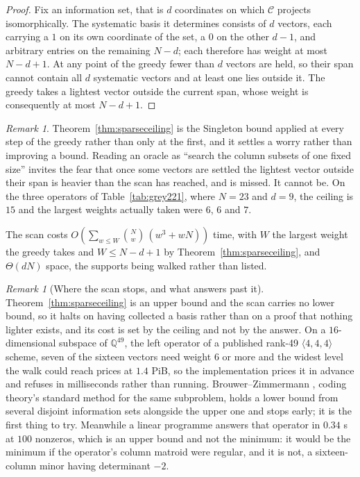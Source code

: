 \documentclass[11pt,reqno]{amsart}
\theoremstyle{plain}
\theoremstyle{definition}
\theoremstyle{remark}
\newtheorem{remark}[theorem]{Remark}
\begin{document}
\begin{proof}
Fix an information set, that is $d$ coordinates on which $\mathcal{C}$ projects
isomorphically. The systematic basis it determines consists of $d$ vectors, each
carrying a $1$ on its own coordinate of the set, a $0$ on the other $d-1$, and
arbitrary entries on the remaining $N-d$; each therefore has weight at most
$N-d+1$. At any point of the greedy fewer than $d$ vectors are held, so their
span cannot contain all $d$ systematic vectors and at least one lies outside it.
The greedy takes a lightest vector outside the current span, whose weight is
consequently at most $N-d+1$.
\end{proof}

\begin{remark}
Theorem~\ref{thm:sparseceiling} is the Singleton bound applied at every step of
the greedy rather than only at the first, and it settles a worry rather than
improving a bound. Reading an oracle as ``search the column subsets of one fixed
size'' invites the fear that once some vectors are settled the lightest vector
outside their span is heavier than the scan has reached, and is missed. It cannot
be. On the three operators of Table~\ref{tab:grey221}, where $N=23$ and $d=9$,
the ceiling is $15$ and the largest weights actually taken were $6$, $6$ and $7$.
\end{remark}

The scan costs $O\!\left(\sum_{w\le W}\binom{N}{w}\,(w^{3}+wN)\right)$ time, with
$W$ the largest weight the greedy takes and $W\le N-d+1$ by
Theorem~\ref{thm:sparseceiling}, and $\Theta(dN)$ space, the supports being
walked rather than listed.

\begin{remark}[Where the scan stops, and what answers past it]
Theorem~\ref{thm:sparseceiling} is an upper bound and the scan carries no lower
bound, so it halts on having collected a basis rather than on a proof that
nothing lighter exists, and its cost is set by the ceiling and not by the answer.
On a $16$-dimensional subspace of $\mathbb{Q}^{49}$, the left operator of a
published rank-49 $\langle 4,4,4\rangle$ scheme, seven of the sixteen vectors
need weight $6$ or more and the widest level the walk could reach prices at
$1.4$ PiB, so the implementation prices it in advance and refuses in
milliseconds rather than running. Brouwer--Zimmermann
\cite{zimmermann1996,lisonek2016}, coding theory's standard method for the same
subproblem, holds a lower bound from several disjoint information sets alongside
the upper one and stops early; it is the first thing to try. Meanwhile a linear
programme answers that operator in $0.34$ s at $100$ nonzeros, which is an upper
bound and not the minimum: it would be the minimum if the operator's column
matroid were regular, and it is not, a sixteen-column minor having determinant
$-2$.
\end{remark}
\end{document}
